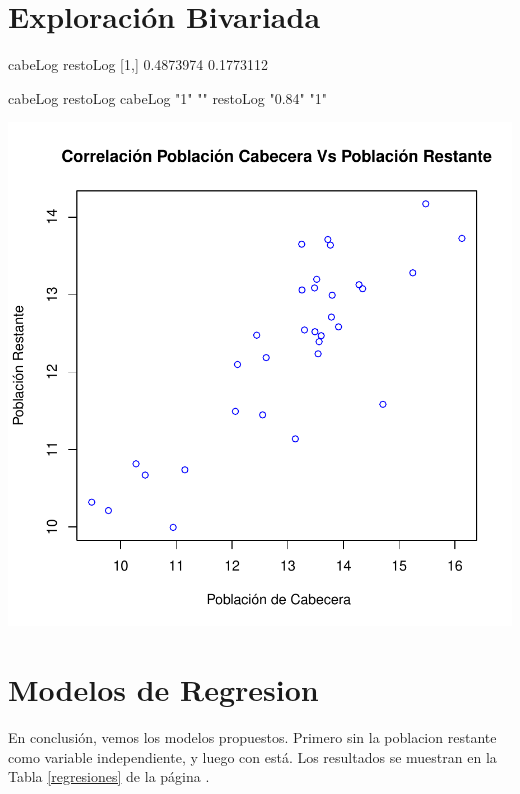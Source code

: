 \documentclass{article}
\begin{document}
\clearpage
\section{Exploración Bivariada}\label{bivariada}



\begin{Schunk}
\begin{Soutput}
       cabeLog  restoLog
[1,] 0.4873974 0.1773112
\end{Soutput}
\begin{Soutput}
         cabeLog restoLog
cabeLog  "1"     ""      
restoLog "0.84"  "1"     
\end{Soutput}
\end{Schunk}
\includegraphics{Preliminar-correl}

\clearpage

\section{Modelos de Regresion}

En conclusión, vemos los modelos propuestos. Primero sin la poblacion restante como variable independiente, y luego con está. Los resultados se muestran en la Tabla \ref{regresiones} de la página \pageref{regresiones}.
\end{document}
